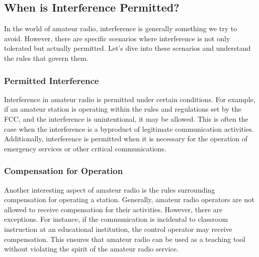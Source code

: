 \subsection{When is Interference Permitted?}
\label{subsec:intf-permitted}

In the world of amateur radio, interference is generally something we try to avoid. However, there are specific scenarios where interference is not only tolerated but actually permitted. Let's dive into these scenarios and understand the rules that govern them.

\subsubsection*{Permitted Interference}
Interference in amateur radio is permitted under certain conditions. For example, if an amateur station is operating within the rules and regulations set by the FCC, and the interference is unintentional, it may be allowed. This is often the case when the interference is a byproduct of legitimate communication activities. Additionally, interference is permitted when it is necessary for the operation of emergency services or other critical communications.

\subsubsection*{Compensation for Operation}
Another interesting aspect of amateur radio is the rules surrounding compensation for operating a station. Generally, amateur radio operators are not allowed to receive compensation for their activities. However, there are exceptions. For instance, if the communication is incidental to classroom instruction at an educational institution, the control operator may receive compensation. This ensures that amateur radio can be used as a teaching tool without violating the spirit of the amateur radio service.



